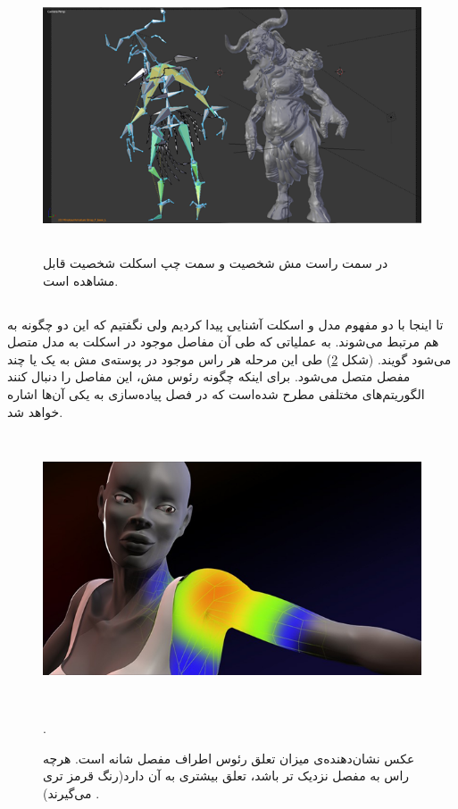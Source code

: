 \begin{figure}[ht]
	\centerline{\includegraphics[width=\textwidth,height=8cm,keepaspectratio]{Figures/Ch2/SkeletalModel.png}}

	\caption{در سمت راست مش شخصیت و سمت چپ اسکلت شخصیت قابل مشاهده است.\cite{SkeletalModelSource}}
	\label{fig:SkeletalModel}
\end{figure}




\subsection{
}

تا اینجا با دو مفهوم مدل و اسکلت آشنایی پیدا کردیم ولی نگفتیم که این دو چگونه به هم مرتبط می‌شوند.
به عملیاتی که طی آن مفاصل موجود در اسکلت به مدل متصل می‌شود 
گویند.
(شکل \ref{fig:Skinning})
طی این مرحله هر راس موجود در پوسته‌ی مش به یک یا چند مفصل متصل می‌شود.
برای اینکه چگونه رئوس مش، این مفاصل را دنبال کنند الگوریتم‌های مختلفی مطرح شده‌است که در فصل پیاده‌سازی به یکی آن‌ها اشاره ‌خواهد شد.

\begin{figure}[ht]
	\centerline{\includegraphics[width=\textwidth,height=8cm,keepaspectratio]{Figures/Ch2/Skinning.png}}

	\caption{عکس نشان‌دهنده‌ی میزان تعلق رئوس اطراف مفصل شانه است. هرچه راس به مفصل نزدیک تر باشد، تعلق بیشتری به آن دارد(رنگ قرمز تری می‌گیرند) \cite{SkinningSource}.}.
	\label{fig:Skinning}
\end{figure}




